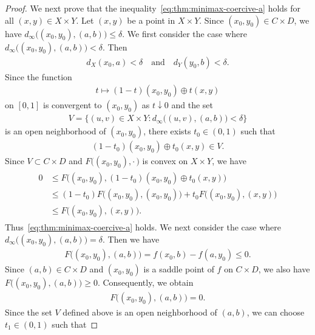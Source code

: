 \documentclass[10pt,a4paper]{amsart}
\begin{document}
\begin{proof}
 We next prove that the inequality~\eqref{eq:thm:minimax-coercive-a} holds 
 for all $(x,y) \in X\times Y$. 
 Let $(x,y)$ be a point in $X\times Y$. 
 Since $(x_0,y_0)\in C\times D$, we have 
 $d_{\infty} \bigl((x_0,y_0), (a,b)\bigr) \leq \delta$.  
 We first consider the case where $d_{\infty}\bigl((x_0,y_0), (a,b)\bigr)<\delta$. 
 Then 
 \begin{align}
  d_X(x_0,a)<\delta\quad \textrm{and} \quad d_Y(y_0,b)<\delta. 
 \end{align}
 \fi
 Since the function 
 \begin{align}
  t\mapsto (1-t) (x_0,y_0) \oplus t (x,y)
 \end{align}
 on $[0,1]$ is convergent to $(x_0,y_0)$ as $t\downarrow 0$ and 
 the set 
 \begin{align}
  V=\bigl\{(u,v)\in X\times Y: 
  d_{\infty} \bigl((u,v), (a,b)\bigr) < \delta
 \bigr\}
 \end{align}
 is an open neighborhood of $(x_0,y_0)$, 
 there exists $t_0\in (0,1)$ such that 
 \begin{align}
  (1-t_0) (x_0,y_0) \oplus t_0 (x,y) 
  \in V. 
 \end{align}
 Since $V\subset C\times D$ and $F\bigl((x_0,y_0),\cdot\,\bigr)$ is convex 
 on $X\times Y$, we have 
 \begin{align}
 \begin{split}
   0 
  &\leq F\bigl((x_0,y_0), (1-t_0) (x_0,y_0) \oplus t_0 (x,y) \bigr) \\
  &\leq (1-t_0) F\bigl((x_0,y_0), (x_0,y_0)\bigr) 
 +t_0 F\bigl((x_0,y_0), (x,y)\bigr) \\
  &\leq F\bigl((x_0,y_0), (x,y) \bigr).   
 \end{split}
 \end{align}
 Thus~\eqref{eq:thm:minimax-coercive-a} holds. 
 We next consider the case where 
 $d_{\infty}\bigl((x_0,y_0), (a,b)\bigr)=\delta$.  
 Then we have 
 \begin{align}
  F\bigl((x_0,y_0), (a,b)\bigr)
  =f(x_0,b) - f(a, y_0) \leq 0. 
 \end{align}
 Since $(a,b)\in C\times D$ and $(x_0,y_0)$ 
 is a saddle point of $f$ on $C\times D$, 
 we also have 
  $F\bigl((x_0,y_0), (a,b)\bigr) \geq 0$. 
 Consequently, we obtain 
 \begin{align}
  F\bigl((x_0,y_0), (a,b)\bigr)=0. 
 \end{align}
 Since the set $V$ defined above is an open neighborhood of $(a,b)$, 
 we can choose $t_1\in (0,1)$ such that 

\end{proof}
\end{document}
